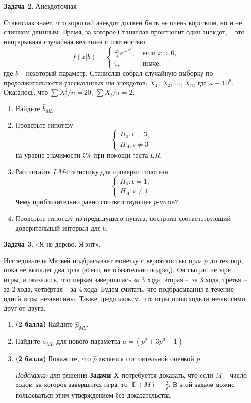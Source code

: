 \documentclass[10pt, a4paper]{extarticle}
\DeclareMathOperator{\E}{\mathbb{E}}
\begin{document}
	{\Large \textbf{Задача 2.} Анекдоточная}
	
	 Станислав знает, что хороший анекдот должен быть не очень коротким, но и не слишком длинным. Время, за которое Станислав произносит один анекдот, – это непрерывная случайная величина с плотностью
	 \[
	 f(x | b) = \begin{cases}
	 	\frac{2x}{b}e^{-\frac{x^2}{b}}, &\text{ если } x > 0, \\
	 	0, &\text{ иначе,}
	 \end{cases}
	 \]
	 где $b$ – некоторый параметр. 
	 Станислав собрал случайную выборку по продолжительности рассказанных им анекдотов: $X_1$, $X_2$, $\ldots$, $X_n$, где $n = 10^6$. 
	 Оказалось, что $\sum X_i^2 /n = 20$, $\sum X_i/n = 2$.
	 
	 \begin{enumerate}
	 	\item Найдите $\hat{b}_{ML}$.
	 	\item Проверьте гипотезу
	 	\[\begin{cases}
	 		H_0: b = 3, \\
	 		H_A: b \ne 3
	 	\end{cases}
	 	\]
	 	на уровне значимости $5\%$ при помощи теста $LR$.
	 	\item Рассчитайте $LM$-статистику для проверки гипотезы
	 	\[\begin{cases}
	 		H_0: b = 1, \\
	 		H_A: b \ne 1
	 	\end{cases}
	 	\]
	 	Чему приблизительно равно соответствующее $p$-value?
	 	\item Проверьте гипотезу из предыдущего пункта, построив соответствующий доверительный интервал для $b$.
	 \end{enumerate}

	{\Large \textbf{Задача 3.} «Я не дерево. Я энт».}
	
	Исследователь Матвей подбрасывает монетку с вероятностью орла $p$ до тех пор, пока не выпадет два орла (всего, не обязательно подряд). Он сыграл четыре игры, и оказалось, что первая завершилась за 3 хода, вторая – за 3 хода, третья – за 2 хода, четвёртая – за 4 хода. Будем считать, что подбрасывания в течение одной игры независимы. Также предположим, что игры происходили независимо друг от друга.
	
	\begin{enumerate}
		\item \textbf{(2 балла)} Найдите $\hat{p}_{ML}$.
		\item Найдите $\hat{a}_{ML}$ для нового параметра $a = (p^2 + 3p^3 - 1)$.
		\item \textbf{(2 балла)} Покажите, что $\hat{p}$ является состоятельной оценкой $p$.
		
		\textit{Подсказка:} для решения \textbf{Задачи X} потребуется доказать, что если $M$ – число ходов, за которое завершится игра, то $\E(M) = \frac{2}{p}$. В этой задаче можно пользоваться этим утверждением без доказательства.
	\end{enumerate}
\end{document}
